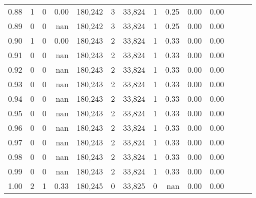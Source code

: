 \begin{tabular}{rrrrrrrrrrrrrr}
0.88 &       1 &      0 &  0.00 &  180,242 &        3 &  33,824 &       1 &  0.25 &  0.00 &      0.00 \\
0.89 &       0 &      0 &   nan &  180,242 &        3 &  33,824 &       1 &  0.25 &  0.00 &      0.00 \\
0.90 &       1 &      0 &  0.00 &  180,243 &        2 &  33,824 &       1 &  0.33 &  0.00 &      0.00 \\
0.91 &       0 &      0 &   nan &  180,243 &        2 &  33,824 &       1 &  0.33 &  0.00 &      0.00 \\
0.92 &       0 &      0 &   nan &  180,243 &        2 &  33,824 &       1 &  0.33 &  0.00 &      0.00 \\
0.93 &       0 &      0 &   nan &  180,243 &        2 &  33,824 &       1 &  0.33 &  0.00 &      0.00 \\
0.94 &       0 &      0 &   nan &  180,243 &        2 &  33,824 &       1 &  0.33 &  0.00 &      0.00 \\
0.95 &       0 &      0 &   nan &  180,243 &        2 &  33,824 &       1 &  0.33 &  0.00 &      0.00 \\
0.96 &       0 &      0 &   nan &  180,243 &        2 &  33,824 &       1 &  0.33 &  0.00 &      0.00 \\
0.97 &       0 &      0 &   nan &  180,243 &        2 &  33,824 &       1 &  0.33 &  0.00 &      0.00 \\
0.98 &       0 &      0 &   nan &  180,243 &        2 &  33,824 &       1 &  0.33 &  0.00 &      0.00 \\
0.99 &       0 &      0 &   nan &  180,243 &        2 &  33,824 &       1 &  0.33 &  0.00 &      0.00 \\
1.00 &       2 &      1 &  0.33 &  180,245 &        0 &  33,825 &       0 &   nan &  0.00 &      0.00 \\
\bottomrule
\end{tabular}
